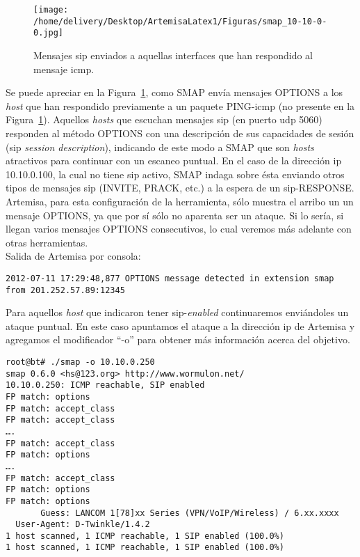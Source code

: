 \documentclass[a4paper,12pt]{report}
\newenvironment{myscriptlisting}
{\begin{list}{}{\setlength{\leftmargin}{1em}}\item\scriptsize\bfseries}
{\end{list}}
\begin{document}
\begin{figure}[h!] 
\centering
\texttt{[image: /home/delivery/Desktop/ArtemisaLatex1/Figuras/smap\_10-10-0-0.jpg]}
\caption{Mensajes \ac{sip} enviados a aquellas interfaces que han respondido al mensaje \ac{icmp}.}
\label{sip_icmp}
\end{figure}
Se puede apreciar en la Figura~\ref{sip_icmp}, como SMAP envía mensajes OPTIONS a los \emph{host} que 
han respondido previamente a un paquete PING-\ac{icmp} (no presente en la Figura~\ref{sip_icmp}).
Aquellos \emph{hosts} que escuchan mensajes \ac{sip} (en puerto \ac{udp} 5060) responden al
método OPTIONS con una descripción de sus capacidades de sesión (\ac{sip} \emph{session
description}), indicando de este modo a SMAP que son \emph{hosts} atractivos para
continuar con un escaneo puntual. En el caso de la dirección \ac{ip} 10.10.0.100, la
cual no tiene \ac{sip} activo, SMAP indaga sobre ésta enviando otros tipos de
mensajes \ac{sip} (INVITE, PRACK, etc.) a la espera de un \ac{sip}-RESPONSE.
Artemisa, para esta configuración de la herramienta, sólo muestra el arribo un
un mensaje OPTIONS, ya que por sí sólo no aparenta ser un ataque. Si lo sería, si
llegan varios mensajes OPTIONS consecutivos, lo cual veremos más adelante con
otras herramientas.\\
Salida de Artemisa por consola:

\begin{myscriptlisting}
 \begin{verbatim}
2012-07-11 17:29:48,877 OPTIONS message detected in extension smap from 201.252.57.89:12345	
 \end{verbatim}
\end{myscriptlisting}

Para aquellos \emph{host} que indicaron tener \ac{sip}-\emph{enabled} continuaremos enviándoles un
ataque puntual. En este caso apuntamos el ataque a la dirección \ac{ip} de Artemisa y
agregamos el modificador “-o” para obtener más información acerca del objetivo.

\begin{myscriptlisting}
 \begin{verbatim}
root@bt# ./smap -o 10.10.0.250
smap 0.6.0 <hs@123.org> http://www.wormulon.net/
10.10.0.250: ICMP reachable, SIP enabled
FP match: options
FP match: accept_class
FP match: accept_class
….
FP match: accept_class
FP match: options
….
FP match: accept_class
FP match: options
FP match: options
       Guess: LANCOM 1[78]xx Series (VPN/VoIP/Wireless) / 6.xx.xxxx
  User-Agent: D-Twinkle/1.4.2
1 host scanned, 1 ICMP reachable, 1 SIP enabled (100.0%)
1 host scanned, 1 ICMP reachable, 1 SIP enabled (100.0%)

 \end{verbatim}
\end{myscriptlisting}
\end{document}
